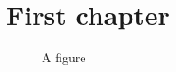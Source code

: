 \documentclass{book}
\begin{document}
	\chapter{First chapter}
	
	\begin{figure}[H]
		\caption{A figure}
	\end{figure}
	
	\begin{example}
		\caption{An example}
	\end{example}
	
\end{document}
